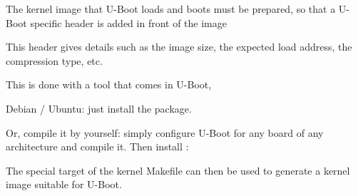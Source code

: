   \startitemize
  \item The kernel image that U-Boot loads and boots must be prepared,
    so that a U-Boot specific header is added in front of the image
    \startitemize
    \item This header gives details such as the image size, the
      expected load address, the compression type, etc.
    \stopitemize
  \item This is done with a tool that comes in U-Boot, 
  \item Debian / Ubuntu: just install the  package.
  \item Or, compile it by yourself: simply configure U-Boot for any
    board of any architecture and compile it. Then install :\\
  \item The special target  of the kernel Makefile can
    then be used to generate a kernel image suitable for U-Boot.
\stopitemize
